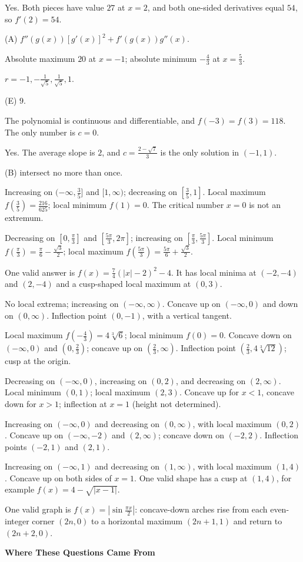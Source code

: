 \documentclass[11pt]{article}
\newcommand{\ansitem}[1]{\item[\textbf{#1.}]}
\begin{document}
\begin{ans}
\ansitem{41} Yes. Both pieces have value $27$ at $x=2$, and both one-sided derivatives equal $54$, so $f'(2)=54$.
\ansitem{42} (A) $f''(g(x))[g'(x)]^2+f'(g(x))g''(x)$.
\ansitem{43} Absolute maximum $20$ at $x=-1$; absolute minimum $-\frac43$ at $x=\frac53$.
\ansitem{44} $r=-1,-\frac1{\sqrt5},\frac1{\sqrt5},1$.
\ansitem{45} (E) $9$.
\ansitem{46} The polynomial is continuous and differentiable, and $f(-3)=f(3)=118$. The only number is $c=0$.
\ansitem{47} Yes. The average slope is $2$, and $c=\frac{2-\sqrt7}{3}$ is the only solution in $(-1,1)$.
\ansitem{48} (B) intersect no more than once.
\ansitem{49} Increasing on $(-\infty,\frac35]$ and $[1,\infty)$; decreasing on $[\frac35,1]$. Local maximum $f(\frac35)=\frac{216}{625}$; local minimum $f(1)=0$. The critical number $x=0$ is not an extremum.
\ansitem{50} Decreasing on $[0,\frac\pi3]$ and $[\frac{5\pi}3,2\pi]$; increasing on $[\frac\pi3,\frac{5\pi}3]$. Local minimum $f(\frac\pi3)=\frac\pi6-\frac{\sqrt3}{2}$; local maximum $f(\frac{5\pi}3)=\frac{5\pi}6+\frac{\sqrt3}{2}$.
\ansitem{51} One valid answer is $f(x)=\frac74(|x|-2)^2-4$. It has local minima at $(-2,-4)$ and $(2,-4)$ and a cusp-shaped local maximum at $(0,3)$.
\ansitem{52} No local extrema; increasing on $(-\infty,\infty)$. Concave up on $(-\infty,0)$ and down on $(0,\infty)$. Inflection point $(0,-1)$, with a vertical tangent.
\ansitem{53} Local maximum $f(-\frac43)=4\sqrt[3]{6}$; local minimum $f(0)=0$. Concave down on $(-\infty,0)$ and $(0,\frac23)$; concave up on $(\frac23,\infty)$. Inflection point $\left(\frac23,4\sqrt[3]{12}\right)$; cusp at the origin.
\ansitem{54} Decreasing on $(-\infty,0)$, increasing on $(0,2)$, and decreasing on $(2,\infty)$. Local minimum $(0,1)$; local maximum $(2,3)$. Concave up for $x<1$, concave down for $x>1$; inflection at $x=1$ (height not determined).
\ansitem{55} Increasing on $(-\infty,0)$ and decreasing on $(0,\infty)$, with local maximum $(0,2)$. Concave up on $(-\infty,-2)$ and $(2,\infty)$; concave down on $(-2,2)$. Inflection points $(-2,1)$ and $(2,1)$.
\ansitem{56} Increasing on $(-\infty,1)$ and decreasing on $(1,\infty)$, with local maximum $(1,4)$. Concave up on both sides of $x=1$. One valid shape has a cusp at $(1,4)$, for example $f(x)=4-\sqrt{|x-1|}$.
\ansitem{57} One valid graph is $f(x)=\left|\sin\frac{\pi x}{2}\right|$: concave-down arches rise from each even-integer corner $(2n,0)$ to a horizontal maximum $(2n+1,1)$ and return to $(2n+2,0)$.
\end{ans}
\clearpage
\begin{center}{\LARGE\bfseries Where These Questions Came From}\end{center}
\end{document}
